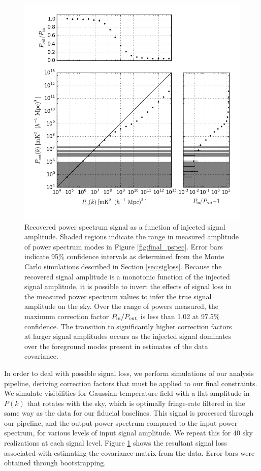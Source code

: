 \documentclass[twocolumn,numberedappendix]{emulateapj} \shorttitle{New Limits on the 21 cm Power Spectrum at $z=8.4$}
\begin{document}
\begin{figure}
\centering
\includegraphics[width=\columnwidth]{plots/sigloss.png}
\caption{
Recovered power spectrum signal as a function of injected signal amplitude.  Shaded regions
indicate the range in measured amplitude of power spectrum modes in Figure \ref{fig:final_pspec}.  
Error bars indicate 95\% confidence intervals as determined from the Monte Carlo simulations
described in Section \ref{sec:sigloss}.
Because
the recovered signal amplitude is a monotonic function of the injected signal amplitude,
it is possible to invert the effects of signal loss in the measured power spectrum values
to infer the true signal amplitude on the sky. Over the range of powers measured, the 
maximum correction factor $P_{\rm in}/P_{\rm out}$ is less than 1.02 at 97.5\% confidence.
The transition to significantly higher correction factors at larger signal amplitudes
occurs as the injected signal
dominates over the foreground modes present in estimates of the data covariance.
}\label{fig:signal_loss}
\end{figure}

In order to deal with possible signal loss, we perform simulations of our analysis pipeline, 
deriving correction factors that must be applied to our final constraints. We simulate visibilities for
Gaussian temperature field with a flat amplitude in $P(k)$ that rotates with the
sky, which is optimally fringe-rate filtered in the same way as the data for our fiducial baselines. This signal is processed through our pipeline, and the output power spectrum compared to the input
power spectrum, for various levels of input signal amplitude.
We repeat this for 40 sky realizations at each signal level.  Figure
\ref{fig:signal_loss} shows the resultant signal loss associated with
estimating the covariance matrix from the data.  Error bars were obtained
through bootstrapping.
\end{document}

